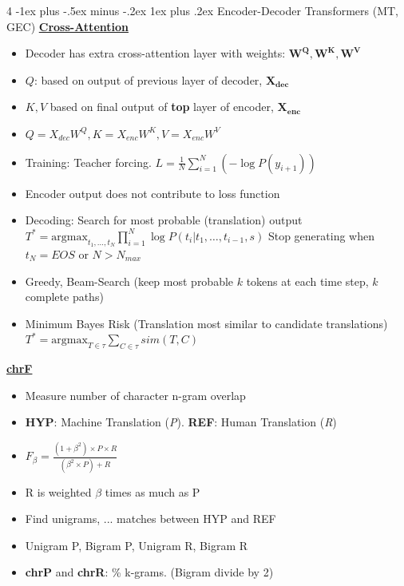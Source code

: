 \documentclass[10pt, landscape]{article}
\makeatletter
\renewcommand{\subsubsection}{\@startsection{subsubsection}{3}{0mm}%
  {-1ex plus -.5ex minus -.2ex}%
  {1ex plus .2ex}%
{\normalfont\small\bfseries}}%
\makeatother
\begin{document}
\begin{multicols*}{4}
  \subsubsection{Encoder-Decoder Transformers (MT, GEC)}
  \underline{\textbf{Cross-Attention}}
  \begin{itemize}
    \item Decoder has extra cross-attention layer with weights: $\mathbf{W^Q, W^K, W^V}$
    \item $Q$: based on output of previous layer of decoder, $\mathbf{X_{dec}}$
    \item $K, V$ based on final output of \textbf{top} layer of encoder, $\mathbf{X_{enc}}$
    \item $Q = X_{dec}W^Q, K=X_{enc}W^K, V=X_{enc}W^V$
    \item Training: Teacher forcing. $L = \frac{1}{N} \sum_{i=1}^N (- \log P(y_{i+1}))$
    \item Encoder output does not contribute to loss function
    \item Decoding: Search for most probable (translation) output $T^* = \text{argmax}_{t_1,\dots,t_N} \prod_{i=1}^{N} \log P(t_i | t_1, \dots, t_{i-1}, s)$
    Stop generating when $t_N = EOS$ or $N>N_{max}$ 
    \item Greedy, Beam-Search (keep most probable $k$ tokens at each time step, $k$ complete paths) 
    \item Minimum Bayes Risk (Translation most similar to candidate translations) $T^* = \text{argmax}_{T \in {\tau}} \sum_{C \in \tau} sim(T,C)$
  \end{itemize}

  \underline{\textbf{chrF}}
  \begin{itemize}
    \item Measure number of character n-gram overlap
    \item \textbf{HYP}: Machine Translation (\textit{P}). \textbf{REF}: Human Translation (\textit{R})
    \item $F_{\beta} = \frac{(1+\beta^2) \times P \times R}{(\beta^2 \times P) + R}$
    \item R is weighted $\beta$ times as much as P
    \item Find unigrams, ... matches between HYP and REF
    \item Unigram P, Bigram P, Unigram R, Bigram R
    \item \textbf{chrP} and \textbf{chrR}: \% k-grams. (Bigram divide by 2)
  \end{itemize}


\end{multicols*}
\end{document}
